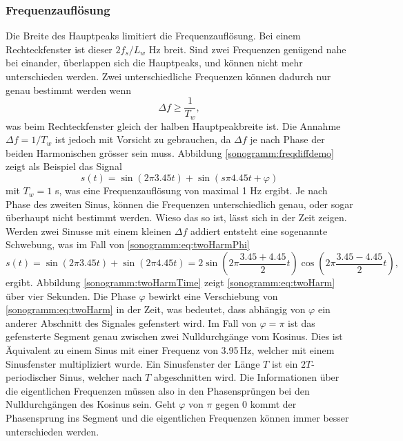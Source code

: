 \subsubsection{Frequenzauflösung}
Die Breite des Hauptpeaks limitiert die Frequenzauflösung.
%
Bei einem Rechteckfenster ist dieser $2f_s/L_w$ Hz breit.
Sind zwei Frequenzen genügend nahe bei einander, überlappen sich die Hauptpeaks, und können
nicht mehr unterschieden werden. 
Zwei unterschiedliche Frequenzen können dadurch nur genau bestimmt werden wenn
\begin{equation}
    \Delta f \geq \frac{1}{T_w},
\end{equation}
was beim Rechteckfenster gleich der halben Hauptpeakbreite ist.
Die Annahme $\Delta f = 1/T_w$ ist jedoch mit Vorsicht zu gebrauchen, da $\Delta f$ je nach 
Phase der beiden Harmonischen grösser sein muss.
Abbildung \ref{sonogramm:freqdiffdemo} zeigt als Beispiel das Signal
\begin{equation}
    s(t) = \sin(2\pi 3.45 t ) + \sin (s\pi 4.45 t + \varphi)
    \label{sonogramm:eq:twoHarmPhi}
\end{equation}
mit $T_w = 1$ s, was eine Frequenzauflösung von maximal 1 Hz ergibt.
Je nach Phase des zweiten Sinus, können die Frequenzen unterschiedlich genau, oder sogar überhaupt nicht
bestimmt werden.
Wieso das so ist, lässt sich in der Zeit zeigen.
Werden zwei Sinusse mit einem kleinen $\Delta f$ addiert entsteht eine sogenannte Schwebung,
%
was im Fall von \eqref{sonogramm:eq:twoHarmPhi}
\begin{equation}
    s(t) = \sin(2\pi 3.45 t ) + \sin (2\pi 4.45 t) = 2 \sin\left(2 \pi \frac{3.45 + 4.45}{2}t\right)
    \cos\left(2 \pi  \frac{3.45 - 4.45}{2} t\right),
\label{sonogramm:eq:twoHarm}
\end{equation}
ergibt.
Abbildung \ref{sonogramm:twoHarmTime} zeigt \eqref{sonogramm:eq:twoHarm} über vier Sekunden.
Die Phase $\varphi$ bewirkt eine Verschiebung von \eqref{sonogramm:eq:twoHarm} in der Zeit, 
was bedeutet, dass abhängig von $\varphi$ ein anderer Abschnitt des Signales gefenstert wird.
Im Fall von $\varphi = \pi$ ist das gefensterte Segment genau zwischen zwei Nulldurchgänge
vom Kosinus.
Dies ist Äquivalent zu einem Sinus mit einer Frequenz von 3.95\,Hz, welcher mit einem 
Sinusfenster multipliziert wurde. 
Ein Sinusfenster der Länge $T$ ist ein $2T$-periodischer Sinus, welcher nach $T$ abgeschnitten wird.
Die Informationen über die eigentlichen Frequenzen müssen also in den Phasensprüngen bei den 
Nulldurchgängen des Kosinus sein.
Geht $\varphi$ von $\pi$ gegen 0 kommt der Phasensprung ins Segment und die eigentlichen Frequenzen
können immer besser unterschieden werden.


